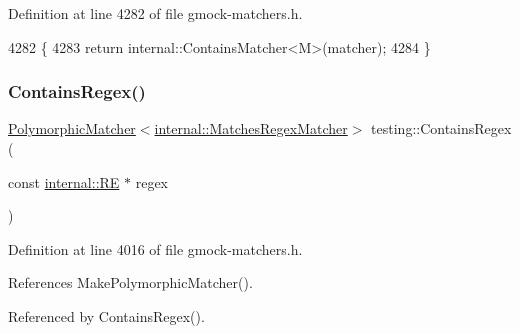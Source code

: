 Definition at line 4282 of file gmock-\/matchers.\+h.


\begin{DoxyCode}
4282                                                       \{
4283   \textcolor{keywordflow}{return} internal::ContainsMatcher<M>(matcher);
4284 \}
\end{DoxyCode}
\mbox{\label{namespacetesting_a899838630a71376aa071dfd7c500f2ca}} 
\subsubsection{\texorpdfstring{Contains\+Regex()}{ContainsRegex()}\hspace{0.1cm}{\footnotesize\ttfamily [1/2]}}
{\footnotesize\ttfamily \hyperlink{classtesting_1_1PolymorphicMatcher}{Polymorphic\+Matcher}$<$\hyperlink{classtesting_1_1internal_1_1MatchesRegexMatcher}{internal\+::\+Matches\+Regex\+Matcher}$>$ testing\+::\+Contains\+Regex (\begin{DoxyParamCaption}\item[{const \hyperlink{classtesting_1_1internal_1_1RE}{internal\+::\+RE} $\ast$}]{regex }\end{DoxyParamCaption})\hspace{0.3cm}{\ttfamily [inline]}}



Definition at line 4016 of file gmock-\/matchers.\+h.



References Make\+Polymorphic\+Matcher().



Referenced by Contains\+Regex().


